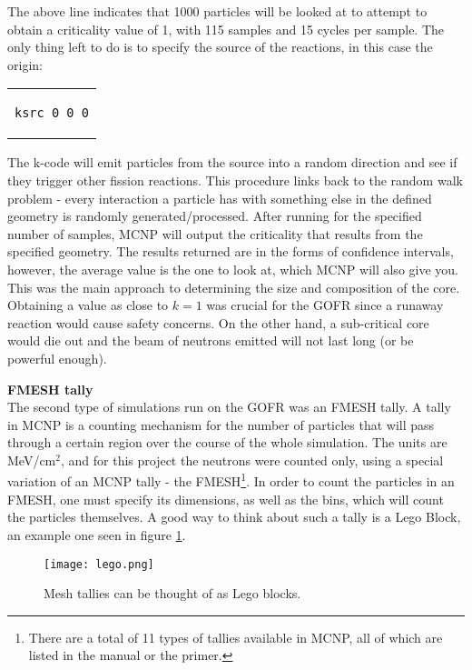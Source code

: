 The above line indicates that 1000 particles will be looked at to attempt to obtain a criticality value of 1, with 115 samples and 15 cycles per sample. The only thing left to do is to specify the source of the reactions, in this case the origin:

\begin{center}
\begin{tabular}{c}
\begin{lstlisting}
ksrc 0 0 0
\end{lstlisting}
\end{tabular}
\end{center}

The k-code will emit particles from the source into a random direction and see if they trigger other fission reactions. This procedure links back to the random walk problem - every interaction a particle has with something else in the defined geometry is randomly generated/processed. After running for the specified number of samples, MCNP will output the criticality that results from the specified geometry. The results returned are in the forms of confidence intervals, however, the average value is the one to look at, which MCNP will also give you. This was the main approach to determining the size and composition of the core. Obtaining a value as close to $k=1$ was crucial for the GOFR since a runaway reaction would cause safety concerns. On the other hand, a sub-critical core would die out and the beam of neutrons emitted will not last long (or be powerful enough).

\textbf{FMESH tally}\\

The second type of simulations run on the GOFR was an FMESH tally. A tally in MCNP is a counting mechanism for the number of particles that will pass through a certain region over the course of the whole simulation. The units are MeV/cm$^2$, and for this project the neutrons were counted only, using a special variation of an MCNP tally - the FMESH\footnote{There are a total of 11 types of tallies available in MCNP, all of which are listed in the manual or the primer.}. In order to count the particles in an FMESH, one must specify its dimensions, as well as the bins, which will count the particles themselves. A good way to think about such a tally is a Lego Block, an example one seen in figure \ref{fig:lego}.

\begin{figure}[!htbp]
\caption{Mesh tallies can be thought of as Lego blocks.}
\label{fig:lego}
\centering
\texttt{[image: lego.png]}
\end{figure}


